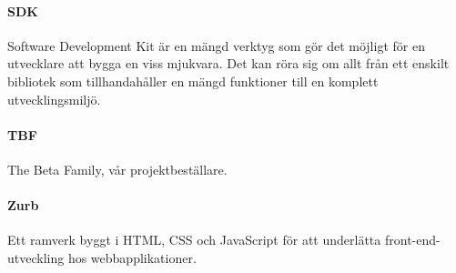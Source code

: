\paragraph{SDK} Software Development Kit är en mängd verktyg som gör det möjligt för en utvecklare att bygga en viss mjukvara. Det kan röra sig om allt från ett enskilt bibliotek som tillhandahåller en mängd funktioner till en komplett utvecklingsmiljö.

\paragraph{TBF} The Beta Family, vår projektbeställare.

\paragraph{Zurb} Ett ramverk byggt i HTML, CSS och JavaScript för att underlätta front-end-utveckling hos webbapplikationer\parencite{zurb}.